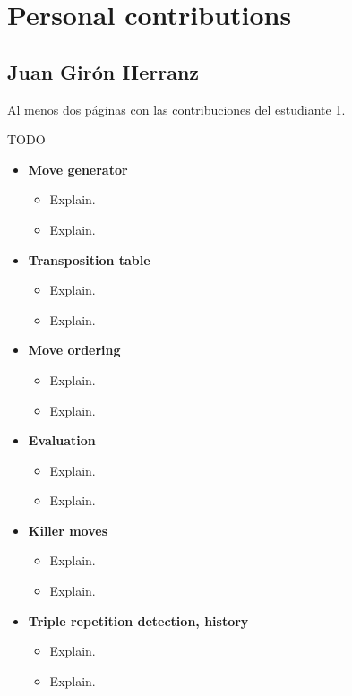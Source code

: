 \chapter*{Personal contributions}
\label{cap:contribucionesPersonales}

\section*{Juan Girón Herranz}
Al menos dos páginas con las contribuciones del estudiante 1.

TODO

\begin{itemize}
    \item \textbf{Move generator}
    \begin{itemize}
        \item Explain.
        \item Explain.
    \end{itemize}
    
    \item \textbf{Transposition table}
    \begin{itemize}
        \item Explain.
        \item Explain.
    \end{itemize}
    
    \item \textbf{Move ordering}
    \begin{itemize}
        \item Explain.
        \item Explain.
    \end{itemize}
   
    \item \textbf{Evaluation}
    \begin{itemize}
        \item Explain.
        \item Explain.
    \end{itemize}

    \item \textbf{Killer moves}
    \begin{itemize}
        \item Explain.
        \item Explain.
    \end{itemize}

    \item \textbf{Triple repetition detection, history}
    \begin{itemize}
        \item Explain.
        \item Explain.
    \end{itemize}


\end{itemize}
